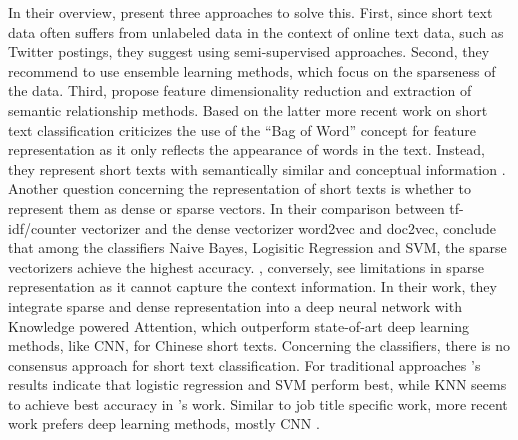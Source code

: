 \documentclass[12pt, a4paper, titlepage]{article}
\begin{document}
In their overview, \cite{Song2014} present three approaches to solve this. First, since short text data often suffers from unlabeled data in the context of online text data, such as Twitter postings, they suggest using semi-supervised approaches. Second, they recommend to use ensemble learning methods, which focus on the sparseness of the data. Third, \cite{Song2014} propose feature dimensionality reduction and extraction of semantic relationship methods. Based on the latter more recent work on short text classification criticizes the use of the ``Bag of Word'' concept for feature representation as it only reflects the appearance of words in the text. Instead, they represent short texts with semantically similar and conceptual information \citep{Bouaziz2014, WangF2014, Chen2019}.
Another question concerning the representation of short texts is whether to represent them as dense or sparse vectors. In their comparison between tf-idf/counter vectorizer and the dense vectorizer word2vec and doc2vec, \cite{WangY2017} conclude that among the classifiers Naive Bayes, Logisitic Regression and SVM, the sparse vectorizers achieve the highest accuracy. \cite{Chen2019}, conversely, see limitations in sparse representation as it cannot capture the context information. In their work, they integrate sparse and dense representation into a deep neural network with Knowledge powered Attention, which outperform state-of-art deep learning methods, like CNN, for Chinese short texts. 
Concerning the classifiers, there is no consensus approach for short text classification. For traditional approaches \cite{WangY2017}'s results indicate that logistic regression and SVM perform best, while KNN seems to achieve best accuracy in \cite{Khamar2013}'s work. Similar to job title specific work, more recent work prefers deep learning methods, mostly CNN \citep{Chen2019}. 




\end{document}
